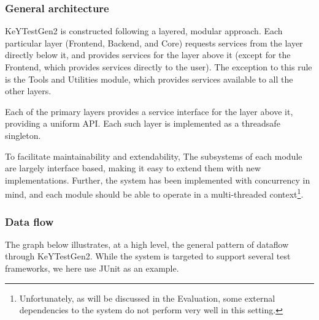 \documentclass{article}
\begin{document}
\subsubsection{General architecture}

KeYTestGen2 is constructed following a layered, modular approach. Each
particular layer (Frontend, Backend, and Core) requests services from the
layer directly below it, and provides services for the layer above it (except
for the Frontend, which provides services directly to the user). The exception
to this rule is the Tools and Utilities module, which provides services
available to all the other layers.



Each of the primary layers provides a service interface for the layer above
it, providing a uniform API. Each such layer is implemented as a threadsafe
singleton.



To facilitate maintainability and extendability, The subsystems of each module
are largely interface based, making it easy to extend them with new
implementations. Further, the system has been implemented with concurrency in
mind, and each module should be able to operate in a multi-threaded
context{\footnote{Unfortunately, as will be discussed in the Evaluation, some
external dependencies to the system do not perform very well in this
setting.}}.



\subsubsection{Data flow}

The graph below illustrates, at a high level, the general pattern of dataflow
through KeYTestGen2. While the system is targeted to support several test
frameworks, we here use JUnit as an example.
\end{document}
